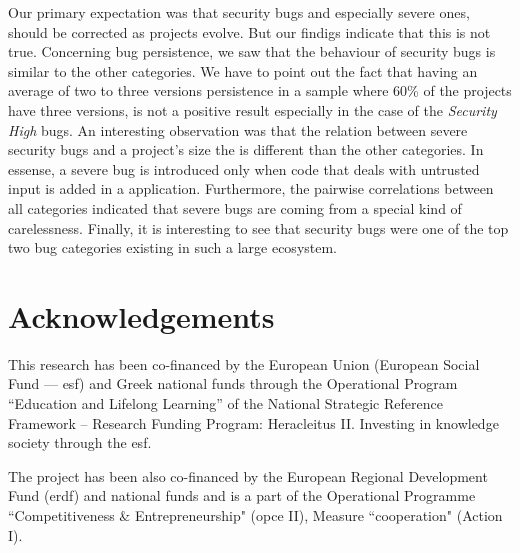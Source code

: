 \documentclass[conference]{llncs}
\begin{document}
Our primary expectation was that security bugs and especially severe
ones, should be corrected as projects evolve. But our findigs indicate that this is
not true. Concerning bug persistence, we saw that the behaviour of security
bugs is similar to the other categories. We have to point out the fact that
having an average of two to three versions persistence in a sample where 60\%
of the projects have three versions, is not a positive result especially in the
case of the {\it Security High} bugs. An interesting observation was that
the relation between severe security bugs and a project's size the is different
than the other categories. In essense, a severe bug is introduced only when code
that deals with untrusted input is added in a application. Furthermore, the
pairwise correlations between all categories indicated that severe bugs are
coming from a special kind of carelessness. Finally, it is interesting to see
that security bugs were one of the top two bug categories existing in such a
large ecosystem.

\section*{Acknowledgements}

This research has been co-financed by the European Union (European Social Fund
--– {\sc esf}) and Greek national funds through the Operational Program
``Education and Lifelong Learning'' of the National Strategic Reference Framework –
Research Funding Program: Heracleitus II. Investing in knowledge society
through the {\sc esf}.

The project has been also co-financed by the European Regional Development Fund ({\sc erdf})
and national funds and is a part of the Operational Programme ``Competitiveness \&
Entrepreneurship" ({\sc opce} II), Measure ``{\sc cooperation}" (Action I).


 
\end{document}
